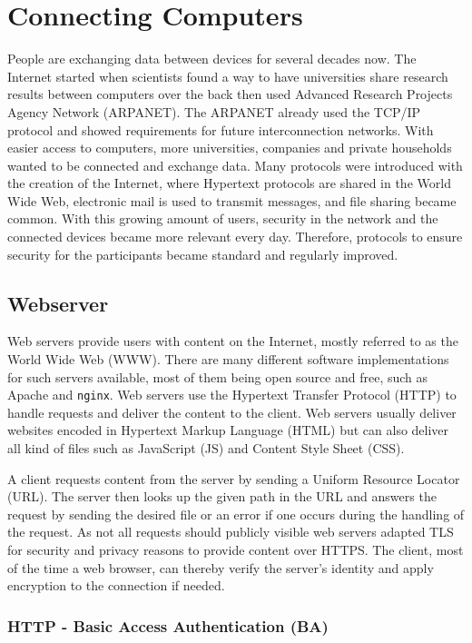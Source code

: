 \section{Connecting Computers}

People are exchanging data between devices for several decades now. The Internet
started when scientists found a way to have universities share research results
between computers over the back then used Advanced Research Projects Agency
Network (ARPANET).  The ARPANET already used the TCP/IP protocol and showed
requirements for future interconnection networks. With easier access to
computers, more universities, companies and private households wanted to be
connected and exchange data. Many protocols were introduced with the creation of
the Internet, where Hypertext protocols are shared in the World Wide Web,
electronic mail is used to transmit messages, and file sharing became common.
With this growing amount of users, security in the network and the connected
devices became more relevant every day. Therefore, protocols to ensure security
for the participants became standard and regularly improved.

\subsection{Webserver}

Web servers provide users with content on the Internet, mostly referred to as
the World Wide Web (WWW). There are many different software implementations for
such servers available, most of them being open source and free, such as
Apache\cite{apacheweb} and \texttt{nginx}\cite{nginxweb}. Web servers use the
Hypertext Transfer Protocol (HTTP) to handle requests and deliver the content to
the client. Web servers usually deliver websites encoded in Hypertext Markup
Language (HTML) but can also deliver all kind of files such as JavaScript (JS)
and Content Style Sheet (CSS).

A client requests content from the server by sending a Uniform Resource Locator
(URL). The server then looks up the given path in the URL and answers the
request by sending the desired file or an error if one occurs during the
handling of the request. As not all requests should publicly visible web servers
adapted TLS for security and privacy reasons to provide content over HTTPS. The
client, most of the time a web browser, can thereby verify the server's identity
and apply encryption to the connection if needed.

\subsubsection{HTTP - Basic Access Authentication (BA)}

